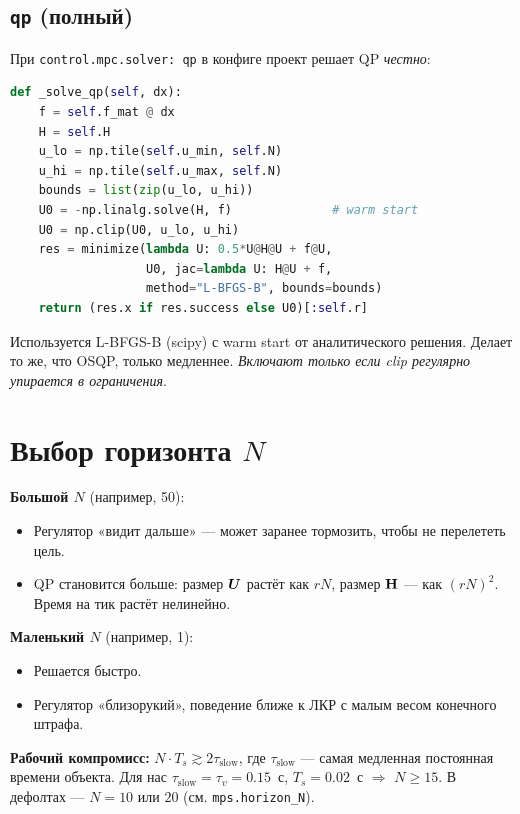 \subsection{\texttt{qp} (полный)}

При \texttt{control.mpc.solver: qp} в конфиге проект решает QP \emph{честно}:

\begin{codebox}[title={\filepath{mpc\_controller.py:303}}]
\begin{lstlisting}[language=Python]
def _solve_qp(self, dx):
    f = self.f_mat @ dx
    H = self.H
    u_lo = np.tile(self.u_min, self.N)
    u_hi = np.tile(self.u_max, self.N)
    bounds = list(zip(u_lo, u_hi))
    U0 = -np.linalg.solve(H, f)              # warm start
    U0 = np.clip(U0, u_lo, u_hi)
    res = minimize(lambda U: 0.5*U@H@U + f@U,
                   U0, jac=lambda U: H@U + f,
                   method="L-BFGS-B", bounds=bounds)
    return (res.x if res.success else U0)[:self.r]
\end{lstlisting}
\end{codebox}

Используется L-BFGS-B (scipy) с warm start от аналитического решения.
Делает то же, что OSQP, только медленнее. \emph{Включают только если
clip регулярно упирается в ограничения}.

\section{Выбор горизонта $N$}

\begin{ideabox}
\textbf{Большой $N$} (например, 50):
\begin{itemize}
  \item Регулятор «видит дальше» --- может заранее тормозить, чтобы
        не перелететь цель.
  \item QP становится больше: размер $\bm{U}$ растёт как $rN$,
        размер $\mathbf{H}$ --- как $(rN)^2$. Время на тик растёт нелинейно.
\end{itemize}

\textbf{Маленький $N$} (например, 1):
\begin{itemize}
  \item Решается быстро.
  \item Регулятор «близорукий», поведение ближе к ЛКР с малым весом
        конечного штрафа.
\end{itemize}

\textbf{Рабочий компромисс:} $N \cdot T_s \gtrsim 2 \tau_\text{slow}$, где
$\tau_\text{slow}$ --- самая медленная постоянная времени объекта. Для
нас $\tau_\text{slow} = \tau_v = 0.15$~с, $T_s = 0.02$~с $\Rightarrow$
$N \ge 15$. В дефолтах --- $N = 10$ или $20$ (см. \texttt{mps.horizon\_N}).
\end{ideabox}


